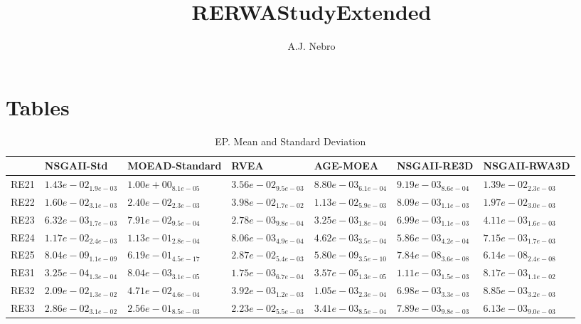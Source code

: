\documentclass{article}
\title{RERWAStudyExtended}
\author{A.J. Nebro}
\begin{document}
\maketitle
\section{Tables}

\begin{table}
\caption{EP. Mean and Standard Deviation}
\label{table: EP}
\centering
\begin{scriptsize}
\begin{tabular}{lllllll}
\hline & NSGAII-Std & MOEAD-Standard & RVEA & AGE-MOEA & NSGAII-RE3D &  NSGAII-RWA3D\\
\hline 
RE21 & $  1.43e-02_{ 1.9e-03}$ & $  1.00e+00_{ 8.1e-05}$ & $  3.56e-02_{ 9.5e-03}$ & \cellcolor{gray95}$  8.80e-03_{ 6.1e-04}$ & \cellcolor{gray25}$  9.19e-03_{ 8.6e-04}$ & $  1.39e-02_{ 2.3e-03}$ \\
RE22 & $  1.60e-02_{ 3.1e-03}$ & $  2.40e-02_{ 2.3e-03}$ & $  3.98e-02_{ 1.7e-02}$ & \cellcolor{gray25}$  1.13e-02_{ 5.9e-03}$ & \cellcolor{gray95}$  8.09e-03_{ 1.1e-03}$ & $  1.97e-02_{ 3.0e-03}$ \\
RE23 & $  6.32e-03_{ 1.7e-03}$ & $  7.91e-02_{ 9.5e-04}$ & \cellcolor{gray95}$  2.78e-03_{ 9.8e-04}$ & \cellcolor{gray25}$  3.25e-03_{ 1.8e-04}$ & $  6.99e-03_{ 1.1e-03}$ & $  4.11e-03_{ 1.6e-03}$ \\
RE24 & $  1.17e-02_{ 2.4e-03}$ & $  1.13e-01_{ 2.8e-04}$ & $  8.06e-03_{ 4.9e-04}$ & \cellcolor{gray95}$  4.62e-03_{ 3.5e-04}$ & \cellcolor{gray25}$  5.86e-03_{ 4.2e-04}$ & $  7.15e-03_{ 1.7e-03}$ \\
RE25 & \cellcolor{gray25}$  8.04e-09_{ 1.1e-09}$ & $  6.19e-01_{ 4.5e-17}$ & $  2.87e-02_{ 5.4e-03}$ & \cellcolor{gray95}$  5.80e-09_{ 3.5e-10}$ & $  7.84e-08_{ 3.6e-08}$ & $  6.14e-08_{ 2.4e-08}$ \\
RE31 & \cellcolor{gray25}$  3.25e-04_{ 1.3e-04}$ & $  8.04e-03_{ 3.1e-05}$ & $  1.75e-03_{ 6.7e-04}$ & \cellcolor{gray95}$  3.57e-05_{ 1.3e-05}$ & $  1.11e-03_{ 1.5e-03}$ & $  8.17e-03_{ 1.1e-02}$ \\
RE32 & $  2.09e-02_{ 1.3e-02}$ & $  4.71e-02_{ 4.6e-04}$ & \cellcolor{gray25}$  3.92e-03_{ 1.2e-03}$ & \cellcolor{gray95}$  1.05e-03_{ 2.3e-04}$ & $  6.98e-03_{ 3.3e-03}$ & $  8.85e-03_{ 3.2e-03}$ \\
RE33 & $  2.86e-02_{ 3.1e-02}$ & $  2.56e-01_{ 8.5e-03}$ & $  2.23e-02_{ 5.5e-03}$ & \cellcolor{gray95}$  3.41e-03_{ 8.5e-04}$ & $  7.89e-03_{ 9.8e-03}$ & \cellcolor{gray25}$  6.13e-03_{ 9.0e-03}$ \\

\end{tabular}
\end{scriptsize}
\end{table}
\end{document}

